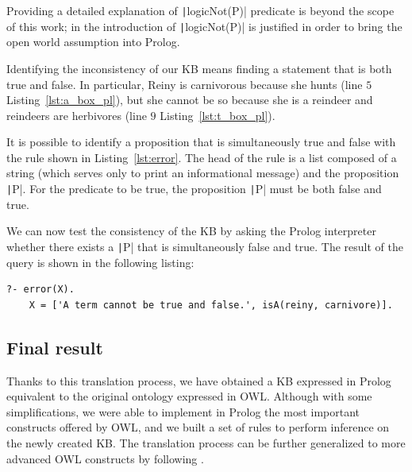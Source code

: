 Providing a detailed explanation of \texttt|logicNot(P)| predicate is beyond the scope of this work; in \cite{samuel2008translating} the introduction of \texttt|logicNot(P)| is justified in order to bring the open world assumption into Prolog.

\begin{listingenv}[h]
	\caption{Disjoint classes}
	\label{lst:disjoint}
\end{listingenv}

Identifying the inconsistency of our KB means finding a statement that is both true and false. In particular, Reiny is carnivorous because she hunts (line $5$ Listing~\ref{lst:a_box_pl}), but she cannot be so because she is a reindeer and reindeers are herbivores (line $9$ Listing~\ref{lst:t_box_pl}).

It is possible to identify a proposition that is simultaneously true and false with the rule shown in Listing~\ref{lst:error}. The head of the rule is a list composed of a string (which serves only to print an informational message) and the proposition \texttt|P|. For the predicate to be true, the proposition \texttt|P| must be both false and true.
\begin{listingenv}[h]
	\caption{Error rule}
	\label{lst:error}
\end{listingenv}

We can now test the consistency of the KB by asking the Prolog interpreter whether there exists a \texttt|P| that is simultaneously false and true. The result of the query is shown in the following listing:
\begin{center}
	\vspace{-.1cm}
	\begin{minipage}{.95\linewidth}
		\begin{verbatim}
?- error(X).
    X = ['A term cannot be true and false.', isA(reiny, carnivore)].
		\end{verbatim}
	\end{minipage}
\end{center}

\subsection{Final result}
Thanks to this translation process, we have obtained a KB expressed in Prolog equivalent to the original ontology expressed in OWL. Although with some simplifications, we were able to implement in Prolog the most important constructs offered by OWL, and we built a set of rules to perform inference on the newly created KB. The translation process can be further generalized to more advanced OWL constructs by following \cite{samuel2008translating}.

